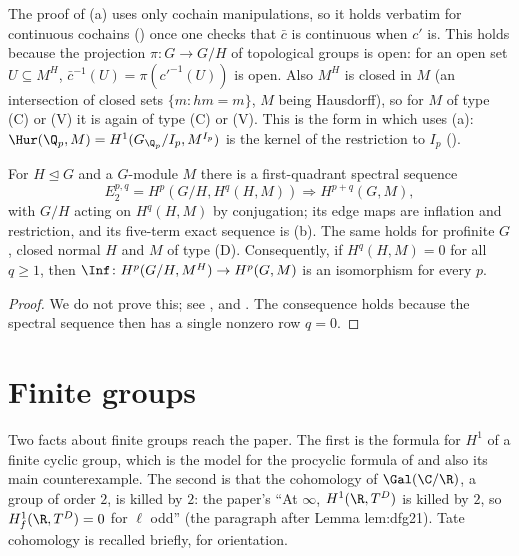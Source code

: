 \begin{remark}\label{rem:cohomology:inf-res-continuous}
The proof of (a) uses only cochain manipulations, so it holds verbatim for continuous cochains () once one checks that
$\bar c$ is continuous when $c'$ is. This holds because the projection $\pi\colon G\to G/H$ of topological groups is open: for an open set $U\subseteq M^H$,
$\bar c^{-1}(U)=\pi(c'^{-1}(U))$ is open. Also $M^H$ is closed in $M$ (an intersection of closed sets $\{m:hm=m\}$, $M$ being Hausdorff), so for $M$ of type (C)
or (V) it is again of type (C) or (V). This is the form in which  uses (a): $\Hur(\Q_p,M)=H^1(G_{\Q_p}/I_p,M^{I_p})$ is the kernel of the restriction
to $I_p$ ().
\end{remark}

\begin{theorem}\label{thm:cohomology:hochschild-serre}
For $H\trianglelefteq G$ and a $G$-module $M$ there is a first-quadrant spectral sequence
\[
E_2^{p,q}=H^p(G/H,H^q(H,M))\Longrightarrow H^{p+q}(G,M),
\]
with $G/H$ acting on $H^q(H,M)$ by conjugation; its edge maps are inflation and restriction, and its five-term exact sequence is
(b). The same holds for profinite $G$, closed normal $H$ and $M$ of type (D). Consequently, if $H^q(H,M)=0$ for all $q\ge1$,
then $\Inf\colon H^p(G/H,M^H)\to H^p(G,M)$ is an isomorphism for every $p$.
\end{theorem}

\begin{proof}
We do not prove this; see \cite[Chapter VII, Section 6]{Brown}, \cite[Section 6.8]{Weibel} and \cite[Chapter II, Section 4]{NSW}. The consequence holds because
the spectral sequence then has a single nonzero row $q=0$.
\end{proof}

\section{Finite groups}\label{sec:cohomology:finite}

Two facts about finite groups reach the paper. The first is the formula for $H^1$ of a finite cyclic group, which is the model for the procyclic
formula of  and also its main counterexample. The second is that the cohomology of $\Gal(\C/\R)$, a group of order $2$, is
killed by $2$: the paper's ``At $\infty$, $H^1(\R,T^D)$ is killed by $2$, so $H^1_f(\R,T^D)=0$ for $\ell$ odd'' (the paragraph after Lemma lem:dfg21). Tate
cohomology is recalled briefly, for orientation.

